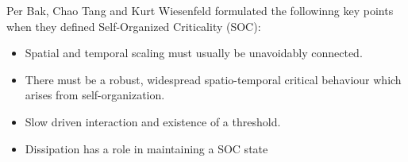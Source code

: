 {
\begin{frame}
Per Bak, Chao Tang and Kurt Wiesenfeld formulated the followinng key points when they defined Self-Organized Criticality (SOC):
\begin{itemize}
	\item Spatial and temporal scaling must usually be unavoidably connected.
	\item There must be a robust, widespread spatio-temporal critical behaviour which arises from self-organization.
	\item Slow driven interaction and existence of a threshold.
	\item Dissipation has a role in maintaining a SOC state
\end{itemize}
\end{frame}
}
